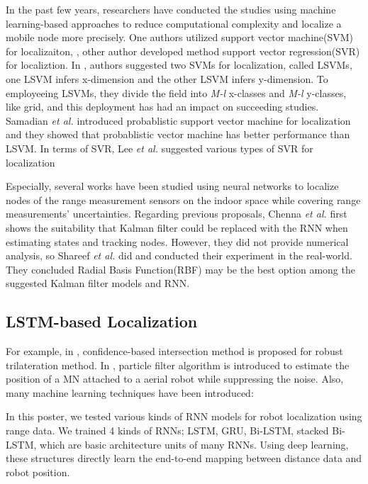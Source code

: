 \documentclass[letterpaper, 10 pt, conference]{ieeeconf}  %
\begin{document}
In the past few years, researchers have conducted the studies using machine learning-based approaches to reduce computational complexity and localize a mobile node more precisely. One authors utilized support vector machine(SVM) for localizaiton, \cite{tran2008localization, huan2010three, feng2012determination, afzal2014localization}, other author developed method support vector regression(SVR) for localiztion\cite{lee2013new, lee2013novel}. In \cite{tran2008localization}, authors suggested two SVMs for localization, called LSVMs, one LSVM infers x-dimension and the other LSVM infers y-dimension. To employeeing LSVMs, they divide the field into \textit{M-l} x-classes and \textit{M-l} y-classes, like grid, and this deployment has had an impact on succeeding studies\cite{chatterjee2010fletcher, feng2012determination, afzal2014localization}. Samadian \textit{et al.}\cite{samadian2011probabilistic} introduced probablistic support vector machine for localization and they showed that probablistic vector machine has better performance than LSVM. In terms of SVR, Lee \textit{et al.} suggested various types of SVR for localization\cite{lee2013new, lee2013novel}  

Especially, several works have been studied using neural networks to localize nodes of the range measurement sensors on the indoor space while covering range measurements' uncertainties. Regarding previous proposals, Chenna \textit{et al.} first shows the suitability that Kalman filter could be replaced with the RNN when estimating states and tracking nodes\cite{chenna2004state}. However, they did not provide numerical analysis, so Shareef \textit{et al.} did and conducted their experiment in the real-world. They concluded Radial Basis Function(RBF) may be the best option among the suggested Kalman filter models and RNN\cite{shareef2008localization}. 

\subsection{LSTM-based Localization}

For example, in \cite{li2017novel}, confidence-based intersection method is proposed for robust trilateration method. In \cite{caballero2008particle}, particle filter algorithm is introduced to estimate the position of a MN attached to a aerial robot while suppressing the noise. Also, many machine learning techniques have been introduced: 


In this poster, we tested various kinds of RNN models for robot localization using range data. We trained 4 kinds of RNNs; LSTM\cite{hochreiter1997long}, GRU\cite{cho2014learning}, Bi-LSTM\cite{schuster1997bidirectional}, stacked Bi-LSTM, which are basic architecture units of many RNNs. Using deep learning, these structures directly learn the end-to-end mapping between distance data and robot position. 
\end{document}
